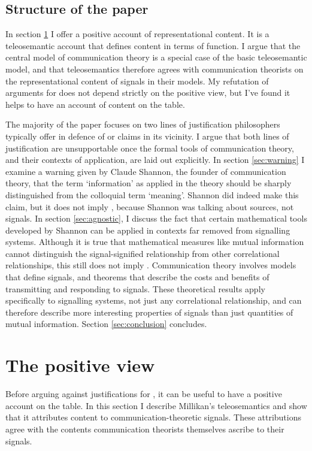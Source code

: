 \documentclass[12pt]{article}
\begin{document}
\subsection{Structure of the paper}

In section \ref{sec:positive} I offer a positive account of representational content.
It is a teleosemantic account that defines content in terms of function.
I argue that the central model of communication theory is a special case of the basic teleosemantic model, and that teleosemantics therefore agrees with communication theorists on the representational content of signals in their models.
My refutation of arguments for \tic{} does not depend strictly on the positive view, but I've found it helps to have an account of content on the table.

The majority of the paper focuses on two lines of justification philosophers typically offer in defence of \tic{} or claims in its vicinity.
I argue that both lines of justification are unsupportable once the formal tools of communication theory, and their contexts of application, are laid out explicitly.
In section \ref{sec:warning} I examine a warning given by Claude Shannon, the founder of communication theory, that the term `information' as applied in the theory should be sharply distinguished from the colloquial term `meaning'.
Shannon did indeed make this claim, but it does not imply \tic{}, because Shannon was talking about sources, not signals.
In section \ref{sec:agnostic}, I discuss the fact that certain mathematical tools developed by Shannon can be applied in contexts far removed from signalling systems.
Although it is true that mathematical measures like mutual information cannot distinguish the signal-signified relationship from other correlational relationships, this still does not imply \tic{}. 
Communication theory involves models that define signals, and theorems that describe the costs and benefits of transmitting and responding to signals.
These theoretical results apply specifically to signalling systems, not just any correlational relationship, and can therefore describe more interesting properties of signals than just quantities of mutual information.
Section \ref{sec:conclusion} concludes.

\section{The positive view}\label{sec:positive}

Before arguing against justifications for \tic{}, it can be useful to have a positive account on the table.
In this section I describe Millikan's teleosemantics and show that it attributes content to communication-theoretic signals.
These attributions agree with the contents communication theorists themselves ascribe to their signals.
\end{document}
